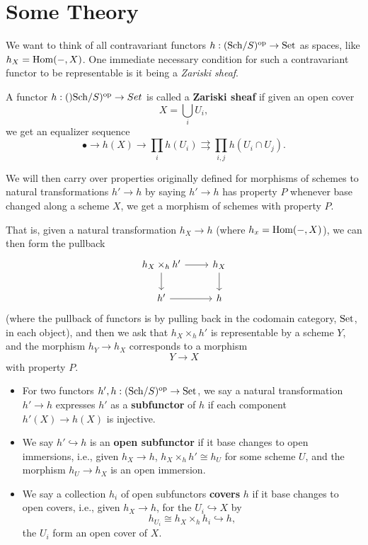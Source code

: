 \documentclass[12pt]{article}
\begin{document}
\section{Some Theory}

We want to think of all contravariant functors $h: (\mathrm{Sch}/S)^{\mathrm{op}} \to \mathrm{Set}$ as spaces, like $h_X = \mathrm{Hom}(-,X)$. One immediate necessary condition for such a contravariant functor to be representable is it being a \textit{Zariski sheaf}.

\begin{defn}
    A functor $h:()\mathrm{Sch}/S)^{\mathrm{op}} \to Set$ is called a \textbf{Zariski sheaf} if given an open cover
    \[X = \bigcup_i U_i,\]
    we get an equalizer sequence
    \[\bullet \to h(X) \to \prod_i h(U_i) \rightrightarrows \prod_{i,j} h(U_i\cap U_j).\]
\end{defn}

We will then carry over properties originally defined for morphisms of schemes to natural transformations $h'\to h$ by saying $h'\to h$ has property $P$ whenever base changed along a scheme $X$, we get a morphism of schemes with property $P$.

That is, given a natural transformation $h_X \to h$ (where $h_x = \mathrm{Hom}(-,X)$), we can then form the pullback
\[\begin{tikzcd}
h_X \times_h h' \dar\rar & h_X \dar\\
h' \rar & h
\end{tikzcd}\]
(where the pullback of functors is by pulling back in the codomain category, $\mathrm{Set}$, in each object), and then we ask that $h_X\times_h h'$ is representable by a scheme $Y$, and the morphism $h_Y\to h_X$ corresponds to a morphism
\[Y\to X\]
with property $P$.

\begin{defn}
    \begin{itemize}
        \item For two functors $h',h: (\mathrm{Sch}/S)^{\mathrm{op}} \to \mathrm{Set}$, we say a natural transformation $h' \to h$ expresses $h'$ as a \textbf{subfunctor} of $h$ if each component $h'(X)\to h(X)$ is injective.
        
        \item We say $h' \hookrightarrow h$ is an \textbf{open subfunctor} if it base changes to open immersions, i.e., given $h_X\to h$, $h_X \times_h h' \cong h_U$ for some scheme $U$, and the morphism $h_U\to h_X$ is an open immersion.
        
        \item We say a collection $h_i$ of open subfunctors \textbf{covers} $h$ if it base changes to open covers, i.e., given $h_X\to h$, for the $U_i\hookrightarrow X$ by
        \[h_{U_i} \cong h_X \times_h h_i \hookrightarrow h,\]
        the $U_i$ form an open cover of $X$.
    \end{itemize}
\end{defn}
\end{document}
